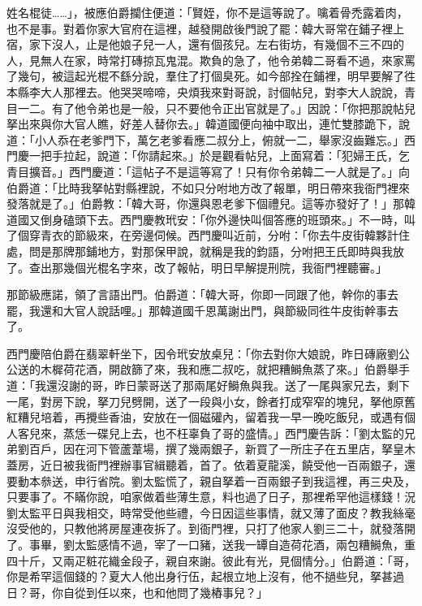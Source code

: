 姓名棍徒……」，被應伯爵攔住便道：「賢姪，你不是這等說了。噙着骨禿露着肉，也不是事。對着你家大官府在這裡，越發開啟後門說了罷：{}韓大哥常在鋪子裡上宿，家下沒人，止是他娘子兒一人，還有個孩兒。左右街坊，有幾個不三不四的人，見無人在家，時常打磚掠瓦鬼混。欺負的急了，他令弟韓二哥看不過，來家罵了幾句，被這起光棍不繇分說，羣住了打個臭死。如今部拴在鋪裡，明早要解了徃本縣李大人那裡去。他哭哭啼啼，央煩我來對哥說，討個帖兒，對李大人說說，青目一二。有了他令弟也是一般，只不要他令正出官就是了。」因說：「你把那說帖兒拏出來與你大官人瞧，好差人替你去。」韓道國便向袖中取出，連忙雙膝跪下，說道：「小人忝在老爹門下，萬乞老爹看應二叔分上，俯就一二，舉家沒齒難忘。」西門慶一把手拉起，說道：「你請起來。」於是觀看帖兒，上面寫着：「犯婦王氏，乞青目擴音。」西門慶道：「這帖子不是這等寫了！只有你令弟韓二一人就是了。」向伯爵道：「比時我拏帖對縣裡說，不如只分咐地方改了報單，明日帶來我衙門裡來發落就是了。」{}伯爵教：「韓大哥，你還與恩老爹下個禮兒。這等亦發好了！」那韓道國又倒身磕頭下去。西門慶教玳安：「你外邊快叫個答應的班頭來。」不一時，叫了個穿青衣的節級來，在旁邊伺候。西門慶叫近前，分咐：「你去牛皮街韓夥計住處，問是那牌那鋪地方，對那保甲說，就稱是我的鈞語，分咐把王氏即時與我放了。查出那幾個光棍名字來，改了報帖，明日早解提刑院，我衙門裡聽審。」

那節級應諾，領了言語出門。伯爵道：「韓大哥，你即一同跟了他，幹你的事去罷，我還和大官人說話哩。」那韓道國千恩萬謝出門，與節級同徃牛皮街幹事去了。

西門慶陪伯爵在翡翠軒坐下，因令玳安放桌兒：「你去對你大娘說，昨日磚廠劉公公送的木樨荷花酒，開啟篩了來，我和應二叔吃，就把糟鰣魚蒸了來。」伯爵舉手道：「我還沒謝的哥，昨日蒙哥送了那兩尾好鰣魚與我。送了一尾與家兄去，剩下一尾，對房下說，拏刀兒劈開，送了一段與小女，餘者打成窄窄的塊兒，拏他原舊紅糟兒培着，再攪些香油，安放在一個磁礶內，留着我一早一晚吃飯兒，或遇有個人客兒來，蒸恁一碟兒上去，也不枉辜負了哥的盛情。」西門慶告訴：「劉太監的兄弟劉百戶，因在河下管蘆葦場，撰了幾兩銀子，新買了一所庄子在五里店，拏皇木蓋房，近日被我衙門裡辦事官緝聽着，首了。依着夏龍溪，饒受他一百兩銀子，還要動本叅送，申行省院。劉太監慌了，親自拏着一百兩銀子到我這裡，再三央及，只要事了。不瞞你說，咱家做着些薄生意，料也過了日子，那裡希罕他這樣錢！況劉太監平日與我相交，時常受他些禮，今日因這些事情，就又薄了面皮？{}教我絲毫沒受他的，只教他將房屋連夜拆了。到衙門裡，只打了他家人劉三二十，就發落開了。事畢，劉太監感情不過，宰了一口豬，送我一罈自造荷花酒，兩包糟鰣魚，重四十斤，又兩疋粧花織金段子，親自來謝。彼此有光，見個情分。」伯爵道：「哥，你是希罕這個錢的？夏大人他出身行伍，起根立地上沒有，他不撾些兒，拏甚過日？哥，你自從到任以來，也和他問了幾樁事兒？」

